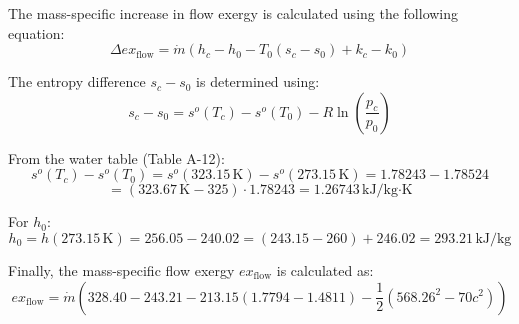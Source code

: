 The mass-specific increase in flow exergy is calculated using the following equation:  
\[
\Delta ex_{\text{flow}} = \dot{m} \left( h_c - h_0 - T_0 (s_c - s_0) + k_c - k_0 \right)
\]

The entropy difference \( s_c - s_0 \) is determined using:  
\[
s_c - s_0 = s^o(T_c) - s^o(T_0) - R \ln \left( \frac{p_c}{p_0} \right)
\]

From the water table (Table A-12):  
\[
s^o(T_c) - s^o(T_0) = s^o(323.15 \, \text{K}) - s^o(273.15 \, \text{K}) = 1.78243 - 1.78524
\]  
\[
= (323.67 \, \text{K} - 325) \cdot 1.78243 = 1.26743 \, \text{kJ/kg·K}
\]

For \( h_0 \):  
\[
h_0 = h(273.15 \, \text{K}) = 256.05 - 240.02 = (243.15 - 260) + 246.02 = 293.21 \, \text{kJ/kg}
\]

Finally, the mass-specific flow exergy \( ex_{\text{flow}} \) is calculated as:  
\[
ex_{\text{flow}} = \dot{m} \left( 328.40 - 243.21 - 213.15 (1.7794 - 1.4811) - \frac{1}{2} (568.26^2 - 70c^2) \right)
\]